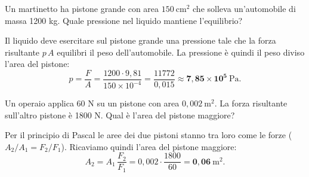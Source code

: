 
\begin{question}[ID=2.4, subtitle={Pressione per sostenere un'automobile sul martinetto}, tags={fluidi, Pascal, martinetto}, difficulty=facile]
Un martinetto ha pistone grande con area $150\ \mathrm{cm^2}$ che solleva un'automobile di massa 1200 kg. Quale pressione nel liquido mantiene l'equilibrio?
\begin{solution}
Il liquido deve esercitare sul pistone grande una pressione tale che la forza risultante $p\,A$ equilibri il peso dell'automobile. La pressione è quindi il peso diviso l'area del pistone:
\[
p = \frac{F}{A} = \frac{1200 \cdot 9{,}81}{150\times10^{-4}} = \frac{11772}{0{,}015} \approx \mathbf{7{,}85\times10^{5}\ \mathrm{Pa}}.
\]
\end{solution}
\end{question}


\begin{question}[ID=2.5, subtitle={Area del pistone maggiore dato il rapporto di forze}, tags={fluidi, Pascal, martinetto}, difficulty=facile]
Un operaio applica 60 N su un pistone con area $0{,}002\ \mathrm{m^2}$. La forza risultante sull'altro pistone è 1800 N. Qual è l'area del pistone maggiore?
\begin{solution}
Per il principio di Pascal le aree dei due pistoni stanno tra loro come le forze ($A_2/A_1 = F_2/F_1$). Ricaviamo quindi l'area del pistone maggiore:
\[
A_2 = A_1\,\frac{F_2}{F_1} = 0{,}002\cdot\frac{1800}{60} = \mathbf{0{,}06\ \mathrm{m^2}}.
\]
\end{solution}
\end{question}

